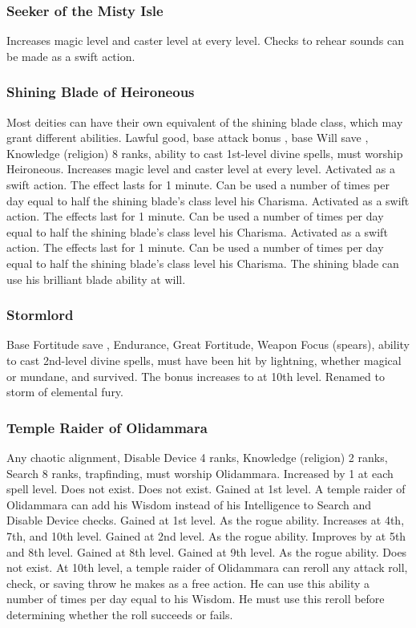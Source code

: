 \subsubsection{Seeker of the Misty Isle}
 Increases magic level and caster level at every level.
 Checks to rehear sounds can be made as a swift action.
\subsubsection{Shining Blade of Heironeous}
 Most deities can have their own equivalent of the shining blade class, which may grant different abilities.
 Lawful good, base attack bonus , base Will save , Knowledge (religion) 8 ranks, ability to cast 1st-level divine spells, must worship Heironeous.
 Increases magic level and caster level at every level.
 Activated as a swift action. The effect lasts for 1 minute. Can be used a number of times per day equal to half the shining blade's class level \add his Charisma.
 Activated as a swift action. The effects last for 1 minute. Can be used a number of times per day equal to half the shining blade's class level \add his Charisma.
 Activated as a swift action. The effects last for 1 minute. Can be used a number of times per day equal to half the shining blade's class level \add his Charisma.
 The shining blade can use his brilliant blade ability at will.
\subsubsection{Stormlord}
 Base Fortitude save , Endurance, Great Fortitude, Weapon Focus (spears), ability to cast 2nd-level divine spells, must have been hit by lightning, whether magical or mundane, and survived.
 The bonus increases to  at 10th level.
 Renamed to storm of elemental fury.
\subsubsection{Temple Raider of Olidammara}
 Any chaotic alignment, Disable Device 4 ranks, Knowledge (religion) 2 ranks, Search 8 ranks, trapfinding, must worship Olidammara.
 Increased by 1 at each spell level.
 Does not exist.
 Does not exist.
 Gained at 1st level. A temple raider of Olidammara can add his Wisdom instead of his Intelligence to Search and Disable Device checks.
 Gained at 1st level. As the rogue ability. Increases at 4th, 7th, and 10th level.
 Gained at 2nd level. As the rogue ability. Improves by  at 5th and 8th level.
 Gained at 8th level.
 Gained at 9th level. As the rogue ability.
 Does not exist.
 At 10th level, a temple raider of Olidammara can reroll any attack roll, check, or saving throw he makes as a free action. He can use this ability a number of times per day equal to his Wisdom. He must use this reroll before determining whether the roll succeeds or fails.
